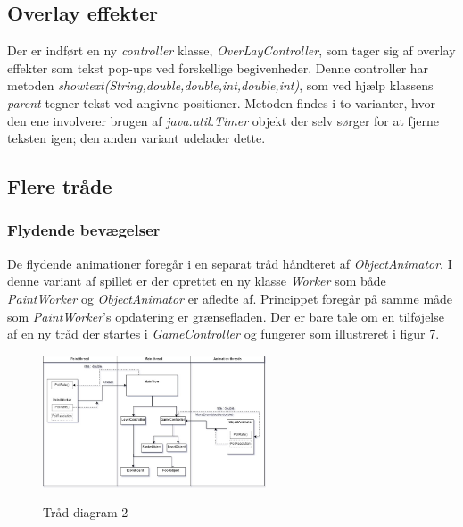 \documentclass[]{article}
\begin{document}
	\subsection{Overlay effekter}
	
	Der er indført en ny \textit{controller} klasse, \textit{OverLayController}, som tager sig af overlay effekter som tekst pop-ups ved forskellige begivenheder. Denne controller har metoden \textit{showtext(String,double,double,int,double,int)}, som ved hjælp klassens \textit{parent} tegner tekst ved angivne positioner. Metoden findes i to varianter, hvor den ene involverer brugen af \textit{java.util.Timer} objekt der selv sørger for at fjerne teksten igen; den anden variant udelader dette.
	
	\subsection{Flere tråde}
	\subsubsection{Flydende bevægelser}
	
	De flydende animationer foregår i en separat tråd håndteret af \textit{ObjectAnimator}. I denne variant af spillet er der oprettet en ny klasse \textit{Worker} som både \textit{PaintWorker} og \textit{ObjectAnimator} er afledte af. Princippet foregår på samme måde som \textit{PaintWorker}'s opdatering er grænsefladen. Der er bare tale om en tilføjelse af en ny tråd der startes i \textit{GameController} og fungerer som illustreret i figur 7.
	
	\begin{figure}[h!]
		\centering
		\includegraphics[width=250px]{Thread_diagram_2.jpg}
		\label{fig:thread2}
		\caption{Tråd diagram 2}
	\end{figure}
	
\end{document}
